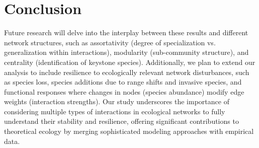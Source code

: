 \documentclass[]{article}
\begin{document}
\section{Conclusion}
Future research will delve into the interplay between these results and different network structures, such as assortativity (degree of specialization vs. generalization within interactions), modularity (sub-community structure), and centrality (identification of keystone species). Additionally, we plan to extend our analysis to include resilience to ecologically relevant network disturbances, such as species loss, species additions due to range shifts and invasive species, and functional responses where changes in nodes (species abundance) modify edge weights (interaction strengths). Our study underscores the importance of considering multiple types of interactions in ecological networks to fully understand their stability and resilience, offering significant contributions to theoretical ecology by merging sophisticated modeling approaches with empirical data.
\end{document}
